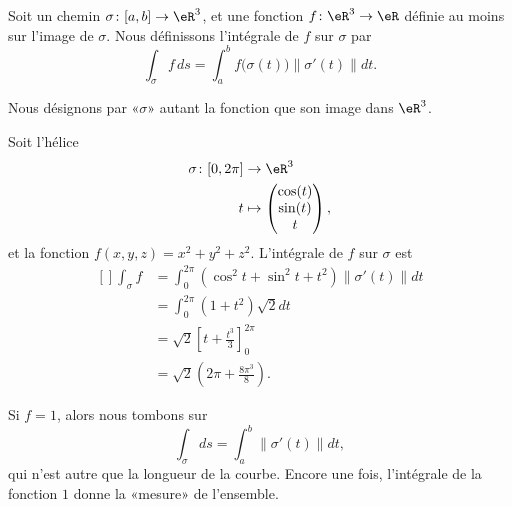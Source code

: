 Soit un chemin $\sigma\colon \mathopen[ a , b \mathclose]\to \eR^3$, et une fonction $f\colon \eR^3 \to \eR$ définie au moins sur l'image de $\sigma$. Nous définissons l'intégrale de $f$ sur $\sigma$ par
\begin{equation}
    \int_{\sigma}f\,ds=\int_a^bf\big( \sigma(t) \big)\| \sigma'(t) \|dt.
\end{equation}

\begin{remark}
    Nous désignons par «$\sigma$» autant la fonction que son image dans $\eR^3$.
\end{remark}


\begin{example}
    Soit l'hélice
    \begin{equation}
        \begin{aligned}
            \sigma\colon \mathopen[ 0 , 2\pi \mathclose]&\to \eR^3 \\
            t&\mapsto \begin{pmatrix}
                \cos(t)    \\ 
                \sin(t)    \\ 
                t    
            \end{pmatrix},
        \end{aligned}
    \end{equation}
    et la fonction $f(x,y,z)=x^2+y^2+z^2$. L'intégrale de $f$ sur $\sigma$ est
    \begin{equation}
        \begin{aligned}[]
            \int_{\sigma}f&=\int_0^{2\pi}(\cos^2t+\sin^2t+t^2)\| \sigma'(t) \|dt\\
            &=\int_0^{2\pi}(1+t^2)\sqrt{2}dt\\
            &=\sqrt{2}\left[ t+\frac{ t^3 }{ 3 } \right]_0^{2\pi}\\
            &=\sqrt{2}\left( 2\pi+\frac{ 8\pi^3 }{ 8 } \right).
        \end{aligned}
    \end{equation}
    
\end{example}

\begin{remark}
    Si $f=1$, alors nous tombons sur
    \begin{equation}
        \int_{\sigma}ds=\int_a^b\| \sigma'(t) \|dt,
    \end{equation}
    qui n'est autre que la longueur de la courbe. Encore une fois, l'intégrale de la fonction $1$ donne la «mesure» de l'ensemble.
\end{remark}

